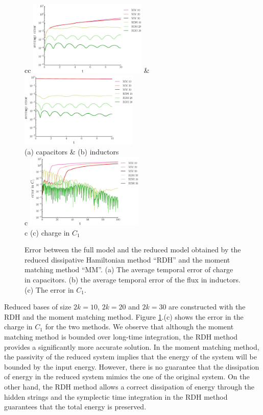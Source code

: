 \begin{figure}
\begin{tabular}{cc}
\includegraphics[width=0.5\textwidth]{./images/paper3/porthamil/error_capac} & 
\includegraphics[width=0.5\textwidth]{./images/paper3/porthamil/error_flux} \\
(a) capacitors & (b) inductors \\
 {c} {\includegraphics[width=0.5\textwidth]{./images/paper3/porthamil/error1}} \\
 {c} {(c) charge in $C_1$} 
\end{tabular}
\caption{Error between the full model and the reduced model obtained by the reduced dissipative Hamiltonian method ``RDH'' and the moment matching method ``MM''. (a) The average temporal error of charge in capacitors. (b) the average temporal error of the flux in inductors. (c) The error in $C_1$.} \label{fig:4.3}
\end{figure}

Reduced bases of size $2k = 10$, $2k = 20$ and $2k = 30$ are constructed with the RDH and the moment matching method. Figure \ref{fig:4.3}.(c) shows the error in the charge in $C_1$ for the two methods. We observe that although the moment matching method is bounded over long-time integration, the RDH method provides a significantly more accurate solution. In the moment matching method, the passivity of the reduced system implies that the energy of the system will be bounded by the input energy. However, there is no guarantee that the dissipation of energy in the reduced system mimics the one of the original system. On the other hand, the RDH method allows a correct dissipation of energy through the hidden strings and the symplectic time integration in the RDH method guarantees that the total energy is preserved.

